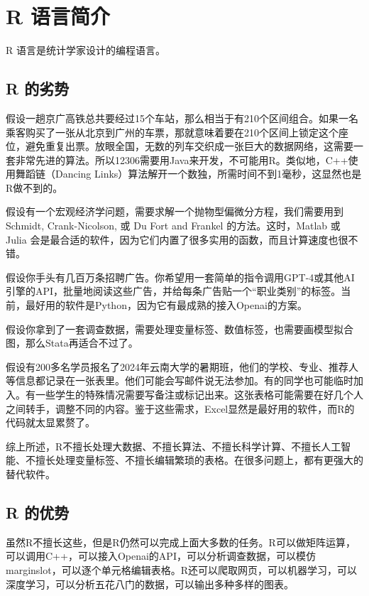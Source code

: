 \documentclass[
  letterpaper,
]{ctexbook}
\begin{document}

\hypertarget{r-ux8bedux8a00ux7b80ux4ecb}{%
\chapter{R 语言简介}\label{r-ux8bedux8a00ux7b80ux4ecb}}

R 语言是统计学家设计的编程语言。

\hypertarget{r-ux7684ux52a3ux52bf}{%
\section{R 的劣势}\label{r-ux7684ux52a3ux52bf}}

假设一趟京广高铁总共要经过15个车站，那么相当于有210个区间组合。如果一名乘客购买了一张从北京到广州的车票，那就意味着要在210个区间上锁定这个座位，避免重复出票。放眼全国，无数的列车交织成一张巨大的数据网络，这需要一套非常先进的算法。所以12306需要用Java来开发，不可能用R。类似地，C++使用舞蹈链（Dancing
Links）算法解开一个数独，所需时间不到1毫秒，这显然也是R做不到的。

假设有一个宏观经济学问题，需要求解一个抛物型偏微分方程，我们需要用到Schmidt,
Crank-Nicolson, 或 Du Fort and Frankel 的方法。这时，Matlab 或 Julia
会是最合适的软件，因为它们内置了很多实用的函数，而且计算速度也很不错。

假设你手头有几百万条招聘广告。你希望用一套简单的指令调用GPT-4或其他AI引擎的API，批量地阅读这些广告，并给每条广告贴一个``职业类别''的标签。当前，最好用的软件是Python，因为它有最成熟的接入Openai的方案。

假设你拿到了一套调查数据，需要处理变量标签、数值标签，也需要画模型拟合图，那么Stata再适合不过了。

假设有200多名学员报名了2024年云南大学的暑期班，他们的学校、专业、推荐人等信息都记录在一张表里。他们可能会写邮件说无法参加。有的同学也可能临时加入。有一些学生的特殊情况需要写备注或标记出来。这张表格可能需要在好几个人之间转手，调整不同的内容。鉴于这些需求，Excel显然是最好用的软件，而R的代码就太显累赘了。

综上所述，R不擅长处理大数据、不擅长算法、不擅长科学计算、不擅长人工智能、不擅长处理变量标签、不擅长编辑繁琐的表格。在很多问题上，都有更强大的替代软件。

\hypertarget{r-ux7684ux4f18ux52bf}{%
\section{R 的优势}\label{r-ux7684ux4f18ux52bf}}

虽然R不擅长这些，但是R仍然可以完成上面大多数的任务。R可以做矩阵运算，可以调用C++，可以接入Openai的API，可以分析调查数据，可以模仿marginslot，可以逐个单元格编辑表格。R还可以爬取网页，可以机器学习，可以深度学习，可以分析五花八门的数据，可以输出多种多样的图表。
\end{document}
